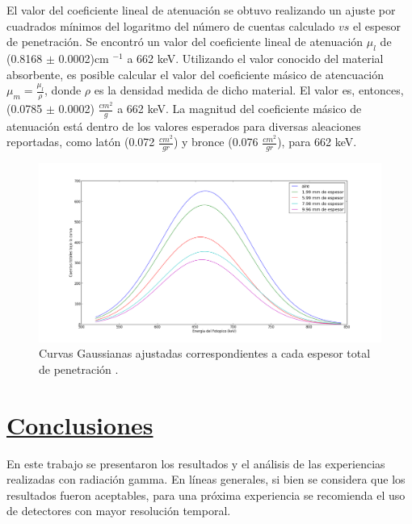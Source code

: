 \documentclass[twoside]{article}
\begin{document}
\begin{multicols}{2}
El valor del coeficiente lineal de atenuación se obtuvo realizando un ajuste por cuadrados mínimos del logaritmo del número de cuentas calculado $vs$ el espesor de penetración. Se encontró un valor del coeficiente lineal de atenuación ${\mu_l}$ de (0.8168 ${\pm}$ 0.0002)cm ${^{-1}}$ a 662 keV. Utilizando el valor conocido del material absorbente, es posible calcular el valor del coeficiente másico de atencuación ${\mu_m = \frac{\mu_l}{\rho}}$, donde ${\rho}$ es la densidad medida de dicho material. El valor es, entonces, (0.0785 ${\pm}$ 0.0002) ${\frac{cm^2}{g}}$ a 662 keV. La magnitud del coeficiente másico de atenuación está dentro de los valores esperados para diversas aleaciones reportadas\cite{bronce}, como latón (0.072 ${\frac{cm^2}{gr}}$) y bronce (0.076 ${\frac{cm^2}{gr}}$), para 662 keV.
 \begin{figure}[H]
    \centering
    \includegraphics[scale=0.2]{Curvas_Gaussianas_Ajustadas.png}
    \caption{Curvas Gaussianas ajustadas correspondientes a cada espesor total de penetración .}
    \label{ajuste_atenuacion}
\end{figure} 



\section*{\underline{Conclusiones}}
En este trabajo se presentaron los resultados y el análisis de las experiencias realizadas con radiación gamma. En líneas generales, si bien se considera que los resultados fueron aceptables, para una próxima experiencia se recomienda el uso de detectores con mayor resolución temporal.


\end{multicols}
\end{document}
